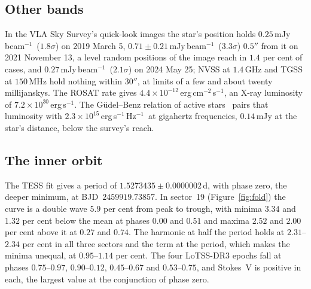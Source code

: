 \documentclass[3p,11pt]{elsarticle}
\newcommand{\mJyb}{mJy\,beam$^{-1}$}
\newcommand{\lnu}{erg\,s$^{-1}$\,Hz$^{-1}$}
\newcommand{\sci}[2]{#1\times10^{#2}}
\begin{document}
\subsection{Other bands}

In the VLA Sky Survey's quick-look images the star's position holds $0.25$\,\mJyb\
($1.8\sigma$) on 2019 March 5, $0.71\pm0.21$\,\mJyb\ ($3.3\sigma$) $0.5''$ from it on 2021
November 13, a level random positions of the image reach in $1.4$ per cent of cases, and
$0.27$\,\mJyb\ ($2.1\sigma$) on 2024 May 25; NVSS at $1.4$\,GHz and TGSS at $150$\,MHz hold
nothing within $30''$, at limits of a few and about twenty millijanskys. The ROSAT rate
gives $\sci{4.4}{-12}$\,erg\,cm$^{-2}$\,s$^{-1}$, an X-ray luminosity of
$\sci{7.2}{30}$\,erg\,s$^{-1}$. The G\"udel--Benz relation of active
stars~\cite{GudelBenz1993} pairs that luminosity with $\sci{2.3}{15}$\,\lnu\ at gigahertz
frequencies, $0.14$\,mJy at the star's distance, below the survey's reach.

\subsection{The inner orbit}

The TESS fit gives a period of $1.5273435\pm0.0000002$\,d, with phase zero, the deeper
minimum, at BJD~$2459919.73857$. In sector~19 (Figure~\ref{fig:fold}) the curve is a
double wave $5.9$ per cent from peak to trough, with minima $3.34$ and $1.32$ per cent
below the mean at phases $0.00$ and $0.51$ and maxima $2.52$ and $2.00$ per cent above it
at $0.27$ and $0.74$. The harmonic at half the period holds at $2.31$--$2.34$ per cent in
all three sectors and the term at the period, which makes the minima unequal, at
$0.95$--$1.14$ per cent. The four LoTSS-DR3 epochs fall at phases $0.75$--$0.97$,
$0.90$--$0.12$, $0.45$--$0.67$ and $0.53$--$0.75$, and Stokes~V is positive in each, the
largest value at the conjunction of phase zero.
\end{document}
